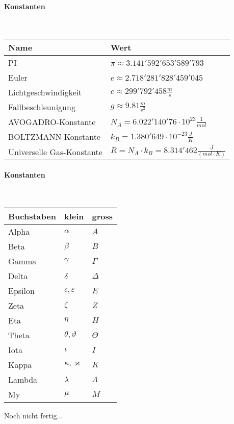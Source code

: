 \paragraph{Konstanten}\mbox{}\\
\begin{tabularx}{\columnwidth}{@{}lX@{}}
	\hline
	Name                      & Wert                                                               \\ \hline
	PI                        & $\pi \approx 3.141'592'653'589'793$                                \\
	Euler                     & $e \approx 2.718'281'828'459'045$                                  \\
	Lichtgeschwindigkeit      & $c \approx 299'792'458 \frac{m}{s}$                                \\
	Fallbeschleunigung        & $g \approx 9.81\frac{m}{s^2} $                                     \\
	AVOGADRO-Konstante        & $N_A = 6.022'140'76\cdot10^{23}\frac{1}{mol}$                      \\
	BOLTZMANN-Konstante       & $k_B = 1.380'649\cdot10^{-23}\frac{J}{K}$                          \\
	Universelle Gas-Konstante & $R = N_A\cdot k_B = 8.314'462 \frac{J}{\left( mol\cdot K \right)}$ \\
\end{tabularx}
\vspace{1mm}

\paragraph{Konstanten}\mbox{}\\
\begin{tabularx}{\columnwidth}{@{}Xll@{}}
	\hline
	Buchstaben & klein                  & gross     \\ \hline
	Alpha      & $\alpha$               & $A$       \\ \hline
	Beta       & $\beta$                & $B$       \\ \hline
	Gamma      & $\gamma$               & $\Gamma$  \\ \hline
	Delta      & $\delta$               & $\Delta$  \\ \hline
	Epsilon    & $\epsilon,\varepsilon$ & $E$       \\ \hline
	Zeta       & $\zeta$                & $Z$       \\ \hline
	Eta        & $\eta$                 & $H$       \\ \hline
	Theta      & $\theta,\vartheta$     & $\Theta$  \\ \hline
	Iota       & $\iota$                & $I$       \\ \hline
	Kappa      & $\kappa,\varkappa$     & $K$       \\ \hline
	Lambda     & $\lambda$              & $\Lambda$ \\ \hline
	My         & $\mu$                  & $M$       \\ \hline
\end{tabularx}
Noch nicht fertig...
\vspace{1mm}